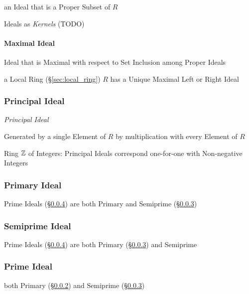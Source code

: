 \begin{itemize}
an Ideal that is a Proper Subset of $R$

Ideals as \emph{Kernels} (TODO)



\paragraph{Maximal Ideal}\label{sec:maximal_ideal}\hfill

Ideal that is Maximal with respect to Set Inclusion among Proper Ideals

a Local Ring (\S\ref{sec:local_ring}) $R$ has a Unique Maximal Left or Right
Ideal



\subsubsection{Principal Ideal}\label{sec:principal_ideal}

\emph{Principal Ideal}

Generated by a single Element of $R$ by multiplication with every
Element of $R$

Ring $\mathbb{Z}$ of Integers: Principal Ideals correspond one-for-one with
Non-negative Integers



\subsubsection{Primary Ideal}\label{sec:primary_ideal}

Prime Ideals (\S\ref{sec:prime_ideal}) are both Primary and Semiprime
(\S\ref{sec:semiprime_ideal})



\subsubsection{Semiprime Ideal}\label{sec:semiprime_ideal}

Prime Ideals (\S\ref{sec:prime_ideal}) are both Primary
(\S\ref{sec:semiprime_ideal}) and Semiprime



\subsubsection{Prime Ideal}\label{sec:prime_ideal}

both Primary (\S\ref{sec:primary_ideal}) and Semiprime
(\S\ref{sec:semiprime_ideal})


\end{itemize}
